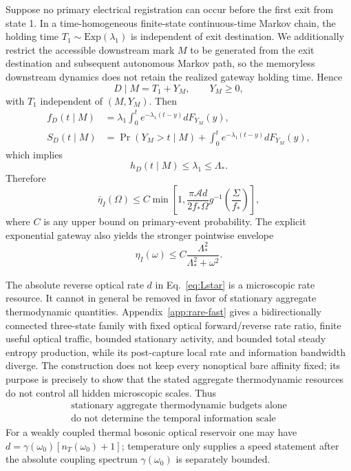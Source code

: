 \documentclass[aps,prapplied,preprint,nofootinbib]{revtex4-2}
\begin{document}
Suppose no primary electrical registration can occur before the first exit from state 1. In a time-homogeneous finite-state continuous-time Markov chain, the holding time $T_1\sim\mathrm{Exp}(\lambda_1)$ is independent of exit destination. We additionally restrict the accessible downstream mark $M$ to be generated from the exit destination and subsequent autonomous Markov path, so the memoryless downstream dynamics does not retain the realized gateway holding time. Hence
\begin{equation}
D\mid M=T_1+Y_M,
\qquad Y_M\ge0,
\end{equation}
with $T_1$ independent of $(M,Y_M)$. Then
\begin{align}
f_D(t\mid M)&=\lambda_1\int_0^t e^{-\lambda_1(t-y)}dF_{Y_M}(y),\\
S_D(t\mid M)&=\Pr(Y_M>t\mid M)+\int_0^t e^{-\lambda_1(t-y)}dF_{Y_M}(y),
\end{align}
which implies
\begin{equation}
\boxed{h_D(t\mid M)\le\lambda_1\le\Lambda_*.}
\label{eq:bridge}
\end{equation}
Therefore
\begin{equation}
\boxed{
\bar\eta_I(\Omega)
\le C\min\left[
1,
\frac{\pi\mathcal A d}{2f_*\Omega}
 g^{-1}\!\left(\frac{\Sigma}{f_*}\right)
\right],}
\label{eq:thermo}
\end{equation}
where $C$ is any upper bound on primary-event probability. The explicit exponential gateway also yields the stronger pointwise envelope
\begin{equation}
\eta_I(\omega)\le
C\frac{\Lambda_*^2}{\Lambda_*^2+\omega^2}.
\end{equation}

The absolute reverse optical rate $d$ in Eq.~\eqref{eq:Lstar} is a microscopic rate resource. It cannot in general be removed in favor of stationary aggregate thermodynamic quantities. Appendix~\ref{app:rare-fast} gives a bidirectionally connected three-state family with fixed optical forward/reverse rate ratio, finite useful optical traffic, bounded stationary activity, and bounded total steady entropy production, while its post-capture local rate and information bandwidth diverge. The construction does not keep every nonoptical bare affinity fixed; its purpose is precisely to show that the stated aggregate thermodynamic resources do not control all hidden microscopic scales. Thus
\begin{equation}
\boxed{
\begin{gathered}
\text{stationary aggregate thermodynamic budgets alone}\\
\text{do not determine the temporal information scale}
\end{gathered}}
\end{equation}
For a weakly coupled thermal bosonic optical reservoir one may have $d=\gamma(\omega_0)[n_T(\omega_0)+1]$; temperature only supplies a speed statement after the absolute coupling spectrum $\gamma(\omega_0)$ is separately bounded.
\end{document}

